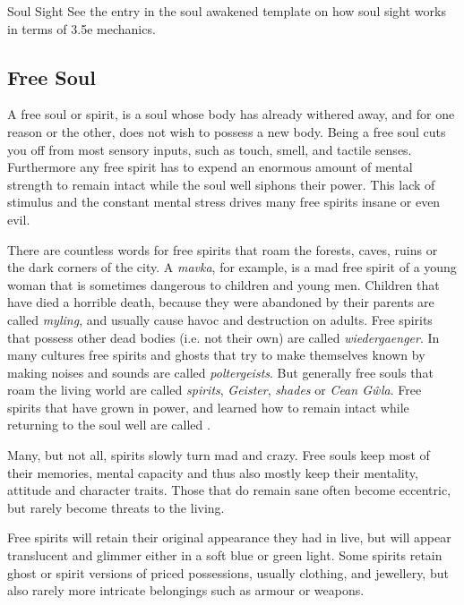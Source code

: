
\begin{35e}{Soul Sight}
  See the entry in the soul awakened template on how soul sight works in terms
  of 3.5e mechanics.
\end{35e}

\subsection{Free Soul}
\label{sec:Free Soul}

A free soul or spirit, is a soul whose body has already withered away, and for
one reason or the other, does not wish to possess a new body. Being a free
soul cuts you off from most sensory inputs, such as touch, smell, and tactile
senses. Furthermore any free spirit has to expend an enormous amount of mental
strength to remain intact while the soul well siphons their power. This lack
of stimulus and the constant mental stress drives many free spirits insane or
even evil.

There are countless words for free spirits that roam the forests, caves, ruins
or the dark corners of the city. A \emph{mavka}, for example, is a mad free
spirit of a young woman that is sometimes dangerous to children and young men.
Children that have died a horrible death, because they were abandoned by their
parents are called \emph{myling}, and usually cause havoc and destruction on
adults. Free spirits that possess other dead bodies (i.e. not their own) are
called \emph{wiedergaenger}. In many cultures free spirits and ghosts that try
to make themselves known by making noises and sounds are called
\emph{poltergeists}. But generally free souls that roam the living world are
called \emph{spirits}, \emph{Geister}, \emph{shades} or \emph{Cean Gŵla}. Free
spirits that have grown in power, and learned how to remain intact while
returning to the soul well are called .

Many, but not all, spirits slowly turn mad and crazy. Free souls keep most of
their memories, mental capacity and thus also mostly keep their mentality,
attitude and character traits. Those that do remain sane often become
eccentric, but rarely become threats to the living.

Free spirits will retain their original appearance they had in live, but will
appear translucent and glimmer either in a soft blue or green light. Some
spirits retain ghost or spirit versions of priced possessions, usually
clothing, and jewellery, but also rarely more intricate belongings such as
armour or weapons.

